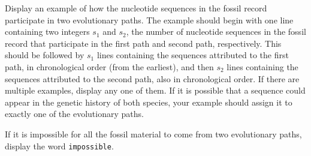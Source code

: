 Display an example of how the nucleotide sequences in the fossil record participate in two evolutionary paths.
The example should begin with one line containing
two integers $s_1$ and $s_2$, the number of nucleotide sequences in the fossil record that participate in the first path and second path, respectively. This should be followed by $s_1$ lines containing the sequences attributed to the first path, in chronological order (from the earliest),
and then $s_2$ lines containing the sequences attributed to the second path,
also in chronological order.
If there are multiple examples, display any one of them.
If it is possible that a sequence could appear in the genetic history of both species, your example should assign it
to exactly one of the evolutionary paths.

If it is impossible for all the fossil material to come from two evolutionary paths,
display the word {\tt impossible}.


